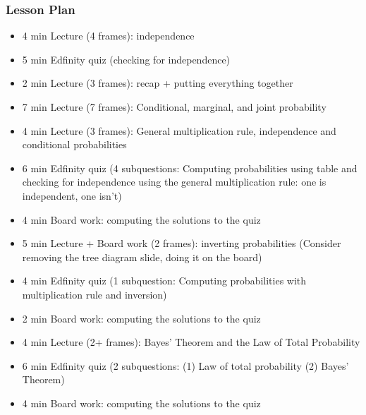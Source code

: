 \begin{frame}
    \frametitle{Lesson Plan}
    \begin{itemize}
        \item 4 min Lecture (4 frames): independence
        \item 5 min Edfinity quiz (checking for independence)
        \item 2 min Lecture (3 frames): recap + putting everything together

        \item 7 min Lecture (7 frames): Conditional, marginal, and joint probability
        \item 4 min Lecture (3 frames): General multiplication rule, independence and conditional probabilities
        \item 6 min Edfinity quiz (4 subquestions: Computing probabilities using table and checking for independence using the general multiplication rule: one is independent, one isn't)
        \item 4 min Board work: computing the solutions to the quiz
        \item 5 min Lecture + Board work (2 frames): inverting probabilities (Consider removing the tree diagram slide, doing it on the board)
        \item 4 min Edfinity quiz (1 subquestion: Computing probabilities with multiplication rule and inversion)
        \item 2 min Board work: computing the solutions to the quiz
        \item 4 min Lecture (2+ frames): Bayes' Theorem and the Law of Total Probability
        \item 6 min Edfinity quiz (2 subquestions: (1) Law of total probability (2) Bayes' Theorem)
        \item 4 min Board work: computing the solutions to the quiz
    \end{itemize}
\end{frame}


